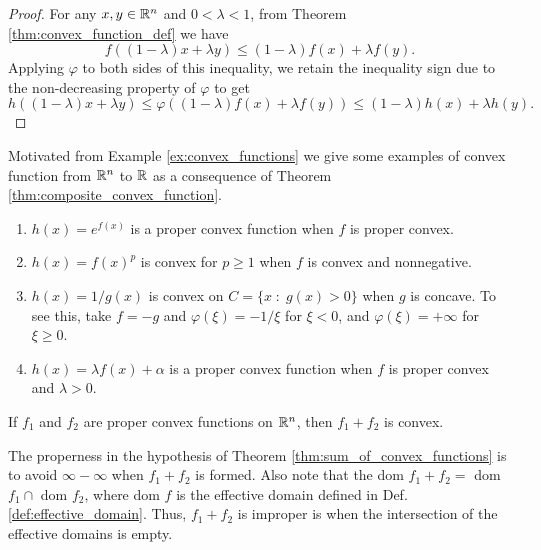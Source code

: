 \documentclass[11pt,a4paper]{article}
\begin{document}
\begin{proof}
    For any $x,y\in \mathbb{R}^n$ and $0<\lambda<1$, from Theorem \ref{thm:convex_function_def} we have
    \begin{equation*}
        f((1-\lambda)x+\lambda y)\le (1-\lambda)f(x)+\lambda f(y).
    \end{equation*}
    Applying $\varphi$ to both sides of this inequality, we retain the inequality sign due to the non-decreasing property of $\varphi$ to get
    \begin{equation*}
        h((1-\lambda)x+\lambda y)\le \varphi((1-\lambda)f(x)+\lambda f(y)) \le (1-\lambda)h(x)+\lambda h(y).
    \end{equation*}
\end{proof}

\begin{example}
    Motivated from Example \ref{ex:convex_functions} we give some examples of convex function from $\mathbb{R}^n$ to $\mathbb{R}$ as a consequence of Theorem \ref{thm:composite_convex_function}.
    \begin{enumerate}
        \item $h(x) = e^{f(x)}$ is a proper convex function when $f$ is proper convex.
        \item $h(x) = f(x)^p$ is convex for $p\ge 1$ when $f$ is convex and nonnegative.
        \item $h(x) = 1/g(x)$ is convex on $C = \{x\;:\; g(x)>0\}$ when $g$ is concave. To see this, take $f = -g$ and $\varphi(\xi) = -1/\xi$ for $\xi<0$, and $\varphi(\xi)=+\infty$ for $\xi\ge 0$.
        \item $h(x) = \lambda f(x)+\alpha$ is a proper convex function when $f$ is proper convex and $\lambda>0$.
    \end{enumerate}
\end{example}

\begin{theorem}\label{thm:sum_of_convex_functions}
    If $f_1$ and $f_2$ are proper convex functions on $\mathbb{R}^n$, then $f_1+f_2$ is convex.
\end{theorem}

\begin{remark}
    The properness in the hypothesis of Theorem \ref{thm:sum_of_convex_functions} is to avoid $\infty-\infty$ when $f_1+f_2$ is formed. Also note that the dom $f_1+f_2 =$ dom $f_1\cap$ dom $f_2$, where dom $f$ is the effective domain defined in Def. \ref{def:effective_domain}. Thus, $f_1+f_2$ is improper is when the intersection of the effective domains is empty. 
\end{remark}
\end{document}
